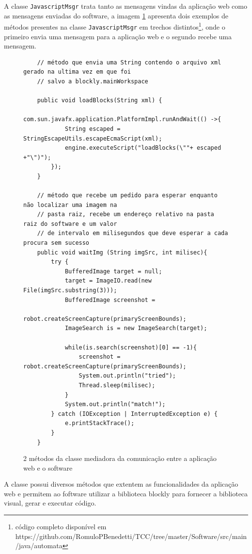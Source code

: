 \documentclass[tg]{mdtufsm}
\begin{document}
    A classe \texttt{JavascriptMsgr} trata tanto as mensagens vindas da aplicação web como as mensagens enviadas do software, a imagem \ref{code:javascriptmsg.java} apresenta dois exemplos de métodos presentes na classe \texttt{JavascriptMsgr} em trechos distintos\footnote{código completo disponível em https://github.com/RomuloPBenedetti/TCC/tree/master/Software/src/main/java/automata}, onde o primeiro envia uma mensagem para a aplicação web e o segundo recebe uma mensagem.


\begin{figure}[!htb]
\begin{lstlisting}
    // método que envia uma String contendo o arquivo xml gerado na ultima vez em que foi
    // salvo a blockly.mainWorkspace

    public void loadBlocks(String xml) {
        com.sun.javafx.application.PlatformImpl.runAndWait(() ->{
            String escaped = StringEscapeUtils.escapeEcmaScript(xml);
            engine.executeScript("loadBlocks(\""+ escaped +"\")");
        });
    }

    // método que recebe um pedido para esperar enquanto não localizar uma imagem na
    // pasta raiz, recebe um endereço relativo na pasta raiz do software e um valor
    // de intervalo em milisegundos que deve esperar a cada procura sem sucesso
    public void waitImg (String imgSrc, int milisec){
        try {
            BufferedImage target = null;
            target = ImageIO.read(new File(imgSrc.substring(3)));
            BufferedImage screenshot =
                robot.createScreenCapture(primaryScreenBounds);
            ImageSearch is = new ImageSearch(target);

            while(is.search(screenshot)[0] == -1){
                screenshot = robot.createScreenCapture(primaryScreenBounds);
                System.out.println("tried");
                Thread.sleep(milisec);
            }
            System.out.println("match!");
        } catch (IOException | InterruptedException e) {
            e.printStackTrace();
        }
    }
\end{lstlisting}
    \caption{2 métodos da classe mediadora da comunicação entre a aplicação web e o software}
	\label{code:javascriptmsg.java}
\end{figure}

    A classe possui diversos métodos que extentem as funcionalidades da aplicação web e permitem ao foftware utilizar a biblioteca blockly para fornecer a biblioteca visual, gerar e executar código.
\end{document}
